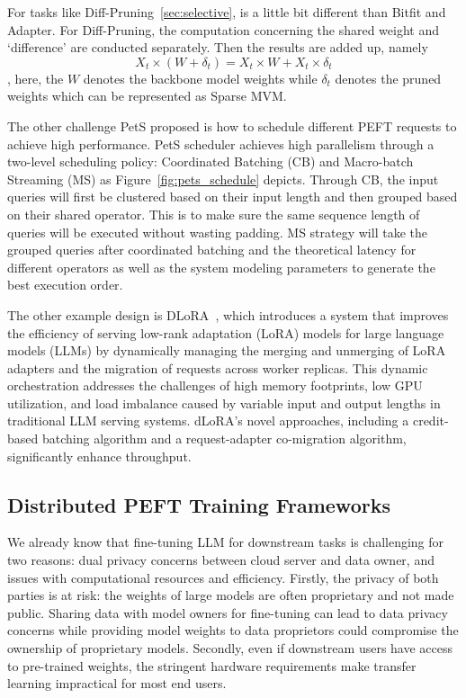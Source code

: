 For tasks like Diff-Pruning~\ref{sec:selective}, is a little bit different than Bitfit and Adapter. For Diff-Pruning, the computation concerning the shared weight and `difference' are conducted separately. Then the results are added up, namely \[ X_t \times (W + \delta_t) = X_t \times W + X_t \times \delta_t\], here, the $W$ denotes the backbone model weights while $\delta_t$ denotes the pruned weights which can be represented as Sparse MVM. 

The other challenge PetS proposed is how to schedule different PEFT requests to achieve high performance. PetS scheduler achieves high parallelism through a two-level scheduling policy: Coordinated Batching (CB) and Macro-batch Streaming (MS) as Figure~\ref{fig:pets_schedule} depicts. Through CB, the input queries will first be clustered based on their input length and then grouped based on their shared operator. This is to make sure the same sequence length of queries will be executed without wasting padding.  MS strategy will take the grouped queries after coordinated batching and the theoretical latency for different operators as well as the system modeling parameters to generate the best execution order.

The other example design is DLoRA~\cite{Dlora-osdi}, which introduces a system that improves the efficiency of serving low-rank adaptation (LoRA) models for large language models (LLMs) by dynamically managing the merging and unmerging of LoRA adapters and the migration of requests across worker replicas. This dynamic orchestration addresses the challenges of high memory footprints, low GPU utilization, and load imbalance caused by variable input and output lengths in traditional LLM serving systems. dLoRA's novel approaches, including a credit-based batching algorithm and a request-adapter co-migration algorithm, significantly enhance throughput.

\subsection{Distributed PEFT Training Frameworks}
\label{sec:offsite}
We already know that fine-tuning LLM for downstream tasks is challenging for two reasons: dual privacy concerns between cloud server and data owner, and issues with computational resources and efficiency. Firstly, the privacy of both parties is at risk: the weights of large models are often proprietary and not made public. Sharing data with model owners for fine-tuning can lead to data privacy concerns while providing model weights to data proprietors could compromise the ownership of proprietary models. Secondly, even if downstream users have access to pre-trained weights, the stringent hardware requirements make transfer learning impractical for most end users.


